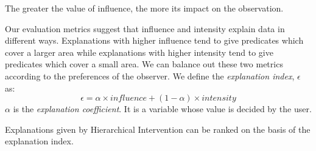The greater the value of influence, the more its impact on the observation.

Our evaluation metrics suggest that influence and intensity explain data in different ways. Explanations with higher influence tend to give predicates which cover a larger area while explanations with higher intensity tend to give predicates which cover a small area. We can balance out these two metrics according to the preferences of the observer. We define the \textit{explanation index}, $\epsilon$ as:
$$\epsilon = \alpha \times influence + (1-\alpha) \times intensity$$
$\alpha$ is the \textit{explanation coefficient}. It is a variable whose value is decided by the user.

Explanations given by Hierarchical Intervention can be ranked on the basis of the explanation index.
